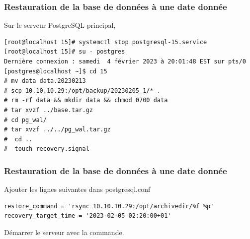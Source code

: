 \begin{frame}[fragile]\frametitle{Restauration de la base de données à une date donnée}

Sur le serveur PostgreSQL principal,

\begin{tiny}
\begin{verbatim}
[root@localhost 15]# systemctl stop postgresql-15.service
[root@localhost 15]# su - postgres
Dernière connexion : samedi  4 février 2023 à 20:01:48 EST sur pts/0
[postgres@localhost ~]$ cd 15
# mv data data.20230213
# scp 10.10.10.29:/opt/backup/20230205_1/* .
# rm -rf data && mkdir data && chmod 0700 data
# tar xvzf ../base.tar.gz 
# cd pg_wal/
# tar xvzf ../../pg_wal.tar.gz 
#  cd ..
#  touch recovery.signal
\end{verbatim}
\end{tiny}

\begin{toile}
\end{toile}

\end{frame}


\begin{frame}[fragile]\frametitle{Restauration de la base de données à une date donnée}

Ajouter les lignes suivantes dans postgresql.conf

\begin{tiny}
\begin{verbatim}
restore_command = 'rsync 10.10.10.29:/opt/archivedir/%f %p'
recovery_target_time = '2023-02-05 02:20:00+01'
\end{verbatim}
\end{tiny}

Démarrer le serveur avec la commande.

\end{frame}


